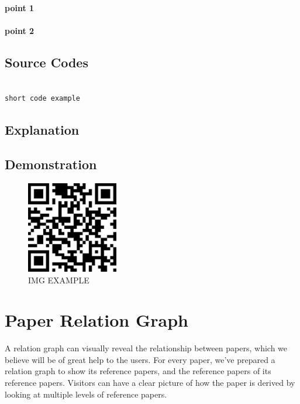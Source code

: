 \documentclass{book}
\begin{document}
\paragraph{point 1}

\paragraph{point 2}

\subsection{Source Codes}

\begin{minipage}[r]{15em}
\begin{verbatim}

short code example

\end{verbatim}
\end{minipage}

\subsection{Explanation}

\subsection{Demonstration}

\begin{figure}[H]
\centering
\includegraphics[height=4.0cm,width=4.0cm]{img/fsh_1.jpg}
\caption{IMG EXAMPLE}
\end{figure}



\section {Paper Relation Graph}

A relation graph can visually reveal the relationship between papers, which we believe will be of great help to the users. For every paper, we've prepared a relation graph to show its reference papers, and the reference papers of its reference papers. Visitors can have a clear picture of how the paper is derived by looking at multiple levels of reference papers.
\end{document}
